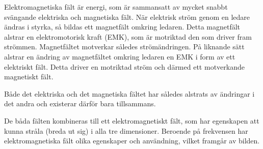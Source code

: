 Elektromagnetiska fält är energi, som är sammansatt av mycket snabbt svängande elektriska
och magnetiska fält. När elektrisk ström genom en ledare ändras i styrka, så bildas ett
magnetfält omkring ledaren. Detta magnetfält alstrar en elektromotorisk kraft (EMK), som
är motriktad den som driver fram strömmen. Magnetfältet motverkar således strömändringen.
På liknande sätt alstrar en ändring av magnetfältet omkring ledaren en EMK i form av ett
elektriskt fält. Detta driver en motriktad ström och därmed ett motverkande magnetiskt
fält.

Både det elektriska och det magnetiska fältet har således alstrats av ändringar i det
andra och existerar därför bara tillsammans.

De båda fälten kombineras till ett elektromagnetiskt fält, som har egenskapen att kunna
stråla (breda ut sig) i alla tre dimensioner. Beroende på frekvensen har
elektromagnetiska fält olika egenskaper och användning, vilket framgår av bilden.


